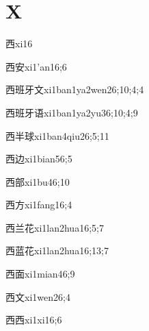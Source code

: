 \section*{X}

\begin{verbete}{西}{xi1}{6}
\end{verbete}
\begin{verbete}{西安}{xi1'an1}{6;6}
\end{verbete}
\begin{verbete}{西班牙文}{xi1ban1ya2wen2}{6;10;4;4}
\end{verbete}
\begin{verbete}{西班牙语}{xi1ban1ya2yu3}{6;10;4;9}
\end{verbete}
\begin{verbete}{西半球}{xi1ban4qiu2}{6;5;11}
\end{verbete}
\begin{verbete}{西边}{xi1bian5}{6;5}
\end{verbete}
\begin{verbete}{西部}{xi1bu4}{6;10}
\end{verbete}
\begin{verbete}{西方}{xi1fang1}{6;4}
\end{verbete}
\begin{verbete}{西兰花}{xi1lan2hua1}{6;5;7}
\end{verbete}
\begin{verbete}{西蓝花}{xi1lan2hua1}{6;13;7}
\end{verbete}
\begin{verbete}{西面}{xi1mian4}{6;9}
\end{verbete}
\begin{verbete}{西文}{xi1wen2}{6;4}
\end{verbete}
\begin{verbete}{西西}{xi1xi1}{6;6}
\end{verbete}
